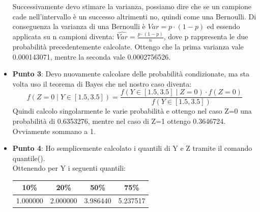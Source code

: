\documentclass[a4paper,12pt]{article}
\begin{document}
\begin{itemize}
	Successivamente devo stimare la varianza, possiamo dire che se un campione cade nell'intervallo è un successo altrimenti no, quindi come una Bernoulli. Di conseguenza la varianza di una Bernoulli è $Var = p \cdot(1-p)$ ed essendo applicata su n campioni diventa: $\hat{Var} =\frac{p \cdot(1-p)}{n}  $, dove p rappresenta le due probabilità precedentemente calcolate. Ottengo che la prima varianza vale 0.000143071, mentre la seconda vale 0.0002756526.
	\item \textbf{Punto 3}: Devo nuovamente calcolare delle probabilità condizionate, ma sta volta uso il teorema di Bayes che nel nostro caso diventa:\\
	\[
	f(Z = 0 \mid Y \in [1.5, 3.5])=\frac{f(Y \in [1.5, 3.5] \mid Z = 0 ) \cdot f(Z = 0)}{f(Y \in [1.5, 3.5])}
	\]
	Quindi calcolo singolarmente le varie probabilità e ottengo nel caso Z=0 una probabilità di 0.6353276, mentre nel caso di Z=1 ottengo 0.3646724. Ovviamente sommano a 1.
	\item \textbf{Punto 4}: Ho semplicemente calcolato i quantili di Y e Z tramite il comando quantile(). \\
	
	Ottenendo per Y i seguenti quantili:\\
	
	\begin{tabular}{|c|c|c|c|}
		\hline
		10\% & 20\% & 50\% & 75\% \\
		\hline
		1.000000 & 2.000000 & 3.986440 & 5.237517 \\
		\hline
	\end{tabular}\\
	

\end{itemize}
\end{document}

